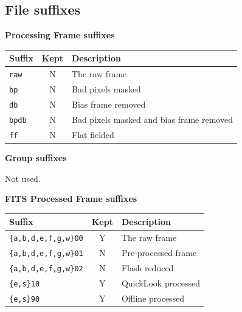 \documentclass[twoside,11pt]{article}
\renewcommand{\_}{\texttt{\symbol{95}}}
\begin{document}
\subsection{File suffixes}

\textbf{Processing Frame suffixes}

\vspace{0.2cm}

\begin{tabular}{l c l}
\hline
Suffix & Kept & Description \hspace{9cm}  \\
\hline
\texttt{\_raw} & N & The raw frame\\
\texttt{\_bp}  & N & Bad pixels masked\\
\texttt{\_db}  & N & Bias frame removed\\
\texttt{\_bp\_db}  & N & Bad pixels masked and bias frame removed\\
\texttt{\_ff}  & N & Flat fielded\\
\hline
\end{tabular}

\vspace{0.5cm}

\textbf{Group suffixes}

\vspace{0.2cm}

Not used.

\vspace{0.5cm}

\textbf{FITS Processed Frame suffixes}

\vspace{0.2cm}

\begin{tabular}{l c l}
\hline
Suffix & Kept & Description \hspace{9cm}  \\
\hline
\texttt{\_\{a,b,d,e,f,g,w\}00} & Y & The raw frame\\
\texttt{\_\{a,b,d,e,f,g,w\}01}  & N & Pre-processed frame\\
\texttt{\_\{a,b,d,e,f,g,w\}02}  & N & Flash reduced\\
\texttt{\_\{e,s\}10}  & Y & QuickLook processed\\
\texttt{\_\{e,s\}90}  & Y & Offline processed\\
\hline
\end{tabular}
\end{document}
